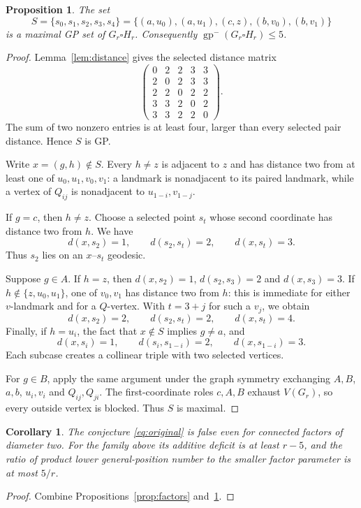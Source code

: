 \documentclass[11pt]{article}
\newtheorem{proposition}[theorem]{Proposition}
\newtheorem{corollary}[theorem]{Corollary}
\theoremstyle{definition}
\theoremstyle{remark}
\newcommand{\lgp}{\operatorname{gp}^{-}}
\begin{document}
\begin{proposition}\label{prop:five-upper}
The set
\begin{equation}\label{eq:selected}
 S=\{s_0,s_1,s_2,s_3,s_4\}
   =\{(a,u_0),(a,u_1),(c,z),(b,v_0),(b,v_1)\}
\end{equation}
is a maximal GP set of $G_r\square H_r$. Consequently
$\lgp(G_r\square H_r)\leq5$.
\end{proposition}
\begin{proof}
Lemma~\ref{lem:distance} gives the selected distance matrix
\begin{equation}\label{eq:matrix}
 \begin{pmatrix}
 0&2&2&3&3\\2&0&2&3&3\\2&2&0&2&2\\
 3&3&2&0&2\\3&3&2&2&0
 \end{pmatrix}.
\end{equation}
The sum of two nonzero entries is at least four, larger than every
selected pair distance. Hence $S$ is GP.

Write $x=(g,h)\notin S$. Every $h\ne z$ is adjacent to $z$ and has
distance two from at least one of $u_0,u_1,v_0,v_1$: a landmark is
nonadjacent to its paired landmark, while a vertex of $Q_{ij}$ is
nonadjacent to $u_{1-i},v_{1-j}$.

If $g=c$, then $h\ne z$. Choose a selected point $s_t$ whose second
coordinate has distance two from $h$. We have
\[
 d(x,s_2)=1,\qquad d(s_2,s_t)=2,\qquad d(x,s_t)=3.
\]
Thus $s_2$ lies on an $x$--$s_t$ geodesic.

Suppose $g\in A$. If $h=z$, then
$d(x,s_2)=1$, $d(s_2,s_3)=2$ and $d(x,s_3)=3$.
If $h\notin\{z,u_0,u_1\}$, one of $v_0,v_1$ has distance two from
$h$: this is immediate for either $v$-landmark and for a $Q$-vertex.
With $t=3+j$ for such a $v_j$, we obtain
\[
 d(x,s_2)=2,\qquad d(s_2,s_t)=2,\qquad d(x,s_t)=4.
\]
Finally, if $h=u_i$, the fact that $x\notin S$ implies $g\ne a$, and
\[
 d(x,s_i)=1,\qquad d(s_i,s_{1-i})=2,\qquad d(x,s_{1-i})=3.
\]
Each subcase creates a collinear triple with two selected vertices.

For $g\in B$, apply the same argument under the graph symmetry exchanging
$A,B$, $a,b$, $u_i,v_i$ and $Q_{ij},Q_{ji}$. The first-coordinate
roles $c,A,B$ exhaust $V(G_r)$, so every outside vertex is blocked.
Thus $S$ is maximal.
\end{proof}

\begin{corollary}\label{cor:counterexample}
The conjecture \eqref{eq:original} is false even for connected factors of
diameter two. For the family above its additive deficit is at least $r-5$,
and the ratio of product lower general-position number to the smaller
factor parameter is at most $5/r$.
\end{corollary}
\begin{proof}
Combine Propositions~\ref{prop:factors} and~\ref{prop:five-upper}.
\end{proof}
\end{document}
